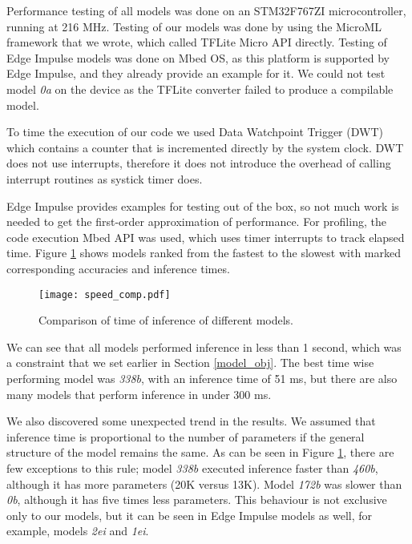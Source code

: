 Performance testing of all models was done on an STM32F767ZI microcontroller, running at 216 \si{\mega\hertz}.
Testing of our models was done by using the MicroML framework that we wrote, which called TFLite Micro API directly.
Testing of Edge Impulse models was done on Mbed OS, as this platform is supported by Edge Impulse, and they already provide an example for it.
We could not test model \textit{0a} on the device as the TFLite converter failed to produce a compilable model.

To time the execution of our code we used Data Watchpoint Trigger (DWT) which contains a counter that is incremented directly by the system clock.
DWT does not use interrupts, therefore it does not introduce the overhead of calling interrupt routines as systick timer does.


Edge Impulse provides examples for testing out of the box, so not much work is needed to get the first-order approximation of performance.
For profiling, the code execution Mbed API was used, which uses timer interrupts to track elapsed time.
Figure \ref{speed_comp} shows models ranked from the fastest to the slowest with marked corresponding accuracies and inference times.

\begin{figure}[ht]
    \centering
    \texttt{[image: speed\_comp.pdf]}
    \caption{ Comparison of time of inference of different models.}
    \label{speed_comp}
\end{figure}

We can see that all models performed inference in less than 1 second, which was a constraint that we set earlier in Section \ref{model_obj}.
The best time wise performing model was \textit{338b}, with an inference time of 51 \si{\milli\second}, but there are also many models that perform inference in under 300 \si{\milli\second}.

We also discovered some unexpected trend in the results.
We assumed that inference time is proportional to the number of parameters if the general structure of the model remains the same.
As can be seen in Figure \ref{speed_comp}, there are few exceptions to this rule; model \textit{338b} executed inference faster than \textit{460b}, although it has more parameters (20K versus 13K).
Model \textit{172b} was slower than \textit{0b}, although it has five times less parameters.
This behaviour is not exclusive only to our models, but it can be seen in Edge Impulse models as well, for example, models \textit{2ei} and \textit{1ei}.


